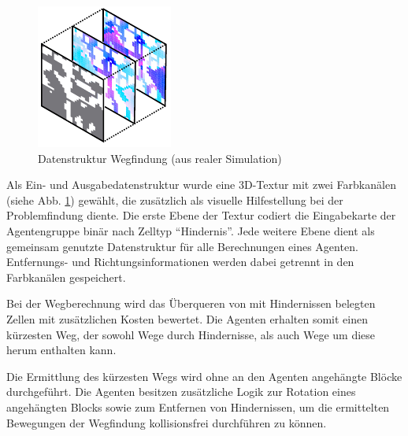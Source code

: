 \documentclass[runningheads]{llncs}
\begin{document}
	\begin{figure}
		\includegraphics{./Referenzen/Pathfinding.pdf}
		\caption{Datenstruktur Wegfindung (aus realer Simulation)}
		\label{pathfinding}
	\end{figure}
	Als Ein- und Ausgabedatenstruktur wurde eine 3D-Textur mit zwei Farbkanälen (siehe Abb. \ref{pathfinding}) gewählt, die zusätzlich als visuelle Hilfestellung bei der Problemfindung diente. Die erste Ebene der Textur codiert die Eingabekarte der Agentengruppe binär nach Zelltyp "`Hindernis"'. Jede weitere Ebene dient als gemeinsam genutzte Datenstruktur für alle Berechnungen eines Agenten. Entfernungs- und Richtungsinformationen werden dabei getrennt in den Farbkanälen gespeichert.
	
	Bei der Wegberechnung wird das Überqueren von mit Hindernissen belegten Zellen mit zusätzlichen Kosten bewertet. Die Agenten erhalten somit einen kürzesten Weg, der sowohl Wege durch Hindernisse, als auch Wege um diese herum enthalten kann.
	
	Die Ermittlung des kürzesten Wegs wird ohne an den Agenten angehängte Blöcke durchgeführt. Die Agenten besitzen zusätzliche Logik zur Rotation eines angehängten Blocks sowie zum Entfernen von Hindernissen, um die ermittelten Bewegungen der Wegfindung kollisionsfrei durchführen zu können.
	
\end{document}
